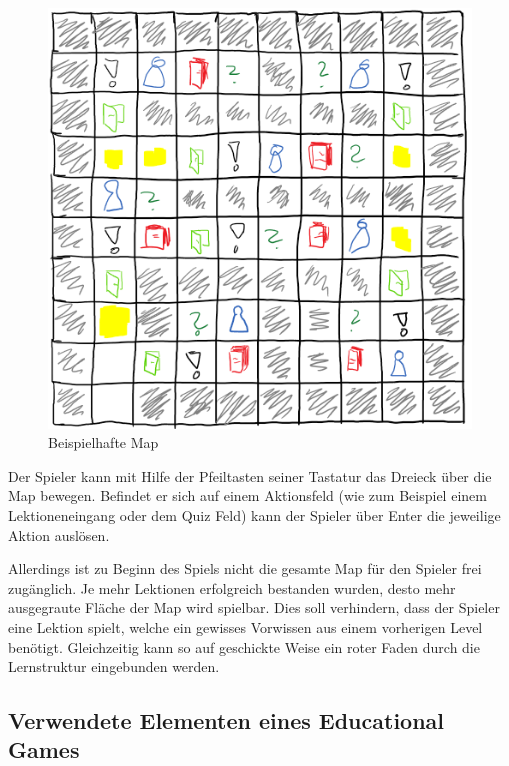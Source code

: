 \newpage

\begin{center}
\begin{figure}[ht]
\centering
\includegraphics[scale=1.1]{bilder/BeispielMap.png}
\caption{Beispielhafte Map}
\label{BildBeispielMap}
\end{figure}
\end{center}

\newpage

Der Spieler kann mit Hilfe der Pfeiltasten seiner Tastatur das Dreieck über die Map bewegen. Befindet er sich auf einem Aktionsfeld (wie zum Beispiel einem Lektioneneingang oder dem Quiz Feld) kann der Spieler über \glqq Enter \grqq die jeweilige Aktion auslösen.

Allerdings ist zu Beginn des Spiels nicht die gesamte Map für den Spieler frei zugänglich. Je mehr Lektionen erfolgreich bestanden wurden, desto mehr ausgegraute Fläche der Map wird spielbar. Dies soll verhindern, dass der Spieler eine Lektion spielt, welche ein gewisses Vorwissen aus einem vorherigen Level benötigt. Gleichzeitig kann so auf geschickte Weise ein roter Faden durch die Lernstruktur eingebunden werden.


\subsection{Verwendete Elementen eines Educational Games}

